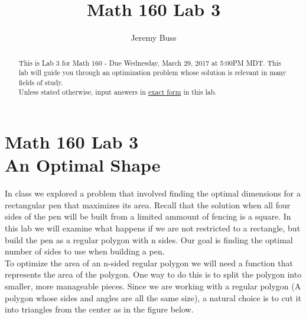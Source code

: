 \documentclass[handout,nooutcomes]{ximera}
\title{Math 160 Lab 3}
\author{Jeremy Buss} %
\begin{document}
\section{Math 160 Lab 3 \\ An Optimal Shape}

\begin{abstract}
This is Lab 3 for Math 160 - Due Wednesday, March 29, 2017 at 5:00PM MDT.
This lab will guide you through an optimization problem whose solution is relevant in many fields of study.\\

Unless stated otherwise, input answers in \underline{exact form} in this lab.
\end{abstract}

\maketitle

\hspace{2cm}In class we explored a problem that involved finding the optimal dimensions for a rectangular pen that maximizes its area. Recall that the solution when all four sides of the pen will be built from a limited ammount of fencing is a square. In this lab we will examine what happens if we are not restricted to a rectangle, but build the pen as a regular polygon with n sides. Our goal is finding the optimal number of sides to use when building a pen.\\

\medskip
\hspace{2cm}To optimize the area of an n-sided regular polygon we will need a function that represents the area of the polygon. One way to do this is to split the polygon into smaller, more manageable pieces. Since we are working with a regular polygon (A polygon whose sides and angles are all the same size), a natural choice is to cut it into triangles from the center as in the figure below.

\begin{center}
\usetikzlibrary{calc,patterns,angles,quotes}
\end{center}
\end{document}
